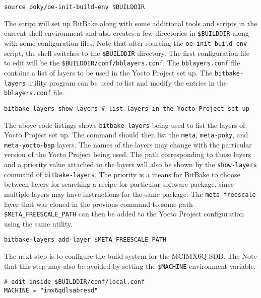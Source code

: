 \begin{verbatim}
source poky/oe-init-build-env $BUILDDIR
\end{verbatim}

The script will set up BitBake along with some additional tools and scripts in the current shell environment and also creates a few directories in \texttt{\$BUILDDIR} along with some configuration files. Note that after sourcing the \texttt{oe-init-build-env} script, the shell switches to the \texttt{\$BUILDDIR} directory. The first configuration file to edit will be the \texttt{\$BUILDDIR/conf/bblayers.conf}. The \texttt{bblayers.conf} file contains a list of layers to be used in the Yocto Project set up. The \texttt{bitbake-layers} utility program can be used to list and modify the entries in the \texttt{bblayers.conf} file.

\begin{verbatim}
bitbake-layers show-layers # list layers in the Yocto Project set up
\end{verbatim}

The above code listings shows \texttt{bitbake-layers} being used to list the layers of Yocto Project set up. The command should then list the \texttt{meta}, \texttt{meta-poky}, and \texttt{meta-yocto-bsp} layers. The names of the layers may change with the particular version of the Yocto Project being used. The path corresponding to those layers and a priority value attached to the layers will also be shown by the \texttt{show-layers} command of \texttt{bitbake-layers}. The priority is a means for BitBake to choose between layers for searching a recipe for particular software package, since multiple layers may have instructions for the same package. The \texttt{meta-freescale} layer that was cloned in the previous command to some path \texttt{\$META\_FREESCALE\_PATH} can then be added to the Yocto Project configuration using the same utility.

\begin{verbatim}
bitbake-layers add-layer $META_FREESCALE_PATH
\end{verbatim}

The next step is to configure the build system for the MCIMX6Q-SDB. The Note that this step may also be avoided by setting the \texttt{\$MACHINE} environment variable.

\begin{verbatim}
# edit inside $BUILDDIR/conf/local.conf
MACHINE = "imx6qdlsabresd"
\end{verbatim}

